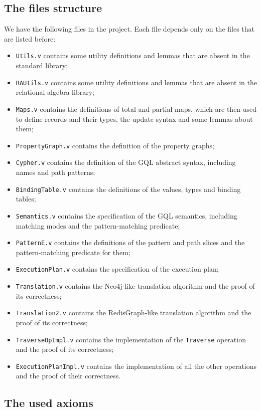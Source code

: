 \documentclass[14pt]{constructor-thesis}
\theoremstyle{definition}
\begin{document}
\subsection{The files structure}

We have the following files in the project. Each file depends only on the files that are listed before:
\begin{itemize}
  \item \texttt{Utils.v} contains some utility definitions and lemmas that are absent in the standard library;
  \item \texttt{RAUtils.v} contains some utility definitions and lemmas that are absent in the relational-algebra library;
  \item \texttt{Maps.v} contains the definitions of total and partial maps, which are then used to define records and their types, the update syntax and some lemmas about them;
  \item \texttt{PropertyGraph.v} contains the definition of the property graphs;
  \item \texttt{Cypher.v} contains the definition of the GQL abstract syntax, including names and path patterns;
  \item \texttt{BindingTable.v} contains the definitions of the values, types and binding tables;
  \item \texttt{Semantics.v} contains the specification of the GQL semantics, including matching modes and the pattern-matching predicate;
  \item \texttt{PatternE.v} contains the definitions of the pattern and path slices and the pattern-matching predicate for them;
  \item \texttt{ExecutionPlan.v} contains the specification of the execution plan;
  \item \texttt{Translation.v} contains the Neo4j-like translation algorithm and the proof of its correctness;
  \item \texttt{Translation2.v} contains the RedisGraph-like translation algorithm and the proof of its correctness;
  \item \texttt{TraverseOpImpl.v} contains the implementation of the \texttt{Traverse} operation and the proof of its correctness;
  \item \texttt{ExecutionPlanImpl.v} contains the implementation of all the other operations and the proof of their correctness.
\end{itemize}

\subsection{The used axioms}
\end{document}

